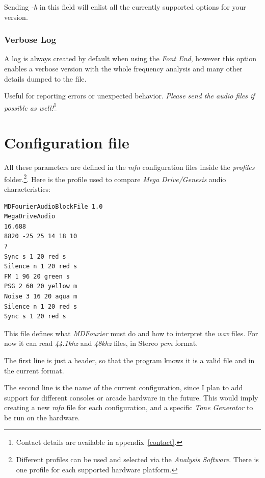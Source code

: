 \documentclass[10pt,a4paper]{report}
\newcommand{\ac}[1]{\textit{\mbox{\acrshort{#1}}}}
\newcommand{\khz}[1]{\textit{\mbox{#1\acrshort{khz}}}}
\begin{document}
\begin{appendices}
Sending \textit{-h} in this field will enlist all the currently supported options for your version.

\subsection{Verbose Log}
\label{verbose}

A log is always created by default when using the \textit{Font End}, however this option enables a verbose version with the whole frequency analysis and many other details dumped to the file. 

Useful for reporting errors or unexpected behavior. \textit{Please send the audio files if possible as well!}\footnote{Contact details are available in appendix~\ref{contact}.}
	
\chapter{Configuration file}
\label{mfnconfig}

All these parameters are defined in the \textit{mfn} configuration files inside the \textit{profiles} folder.\footnote{Different profiles can be used and selected via the \textit{Analysis Software}. There is one profile for each supported hardware platform.}. Here is the profile used to compare \textit{Mega Drive/Genesis} audio characteristics:

\begin{verbatim}
MDFourierAudioBlockFile 1.0
MegaDriveAudio
16.688
8820 -25 25 14 18 10
7
Sync s 1 20 red s
Silence n 1 20 red s
FM 1 96 20 green s
PSG 2 60 20 yellow m
Noise 3 16 20 aqua m
Silence n 1 20 red s
Sync s 1 20 red s
\end{verbatim}

This file defines what \textit{MDFourier} must do and how to interpret the \ac{wav} files. For now it can read \khz{44.1} and \khz{48} files, in Stereo \ac{pcm} format.

The first line is just a header, so that the program knows it is a valid file and in the current format.

The second line is the name of the current configuration, since I plan to add support for different consoles or arcade hardware in the future. This would imply creating a new \textit{mfn} file for each configuration, and a specific \textit{Tone Generator} to be run on the hardware.


\end{appendices}
\end{document}
